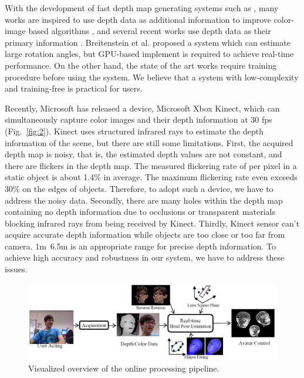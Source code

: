 With the development of fast depth map generating systems such as \cite{Ref12}, many works are inspired to use depth data as additional information to improve color-image based algorithms \cite{Ref1,Ref14,Ref20}, and several recent works use depth data as their primary information \cite{Ref3,Ref9,Ref16,Ref19}. Breitenstein et al. \cite{Ref3} proposed a system which can estimate large rotation angles, but GPU-based implement is required to achieve real-time performance.   On the other hand, the state of the art works \cite{Ref16,Ref19} require training procedure before using the system. We believe that a system with low-complexity and training-free is practical for users.

Recently, Microsoft has released a device, Microsoft Xbox Kinect, which can simultaneously capture color images and their depth information at 30 fps (Fig.~\ref{fig:2}). Kinect uses structured infrared rays to estimate the depth information of the scene, but there are still some limitations. First, the acquired depth map is noisy, that is, the estimated depth values are not constant, and there are flickers in the depth map. The measured flickering rate of per pixel in a static object is about 1.4\% in average. The maximum flickering rate even exceeds 30\% on the edges of objects. Therefore, to adopt such a device, we have to address the noisy data. Secondly, there are many holes within the depth map containing no depth information due to occlusions or transparent materials blocking infrared rays from being received by Kinect. Thirdly, Kinect sensor can’t acquire accurate depth information while objects are too close or too far from camera.  1m~6.5m is an appropriate range for precise depth information. To achieve high accuracy and robustness in our system, we have to address these issues.

\begin{figure}
\includegraphics[width=1.0\linewidth]{./fig3.png}
\caption{Visualized overview of the online processing pipeline.}
\label{fig:3}       %
\end{figure}

